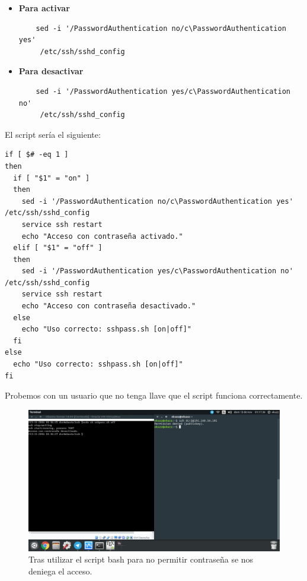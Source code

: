 \begin{flushleft}
\begin{itemize}
	\item \textbf{Para activar} \begin{verbatim}
	sed -i '/PasswordAuthentication no/c\PasswordAuthentication yes'
	 /etc/ssh/sshd_config
	\end{verbatim}
	\item \textbf{Para desactivar} \begin{verbatim}
	sed -i '/PasswordAuthentication yes/c\PasswordAuthentication no'
	 /etc/ssh/sshd_config
	 \end{verbatim}
\end{itemize}
El script sería el siguiente:

\begin{verbatim}
if [ $# -eq 1 ] 
then
  if [ "$1" = "on" ]
  then
    sed -i '/PasswordAuthentication no/c\PasswordAuthentication yes' /etc/ssh/sshd_config
    service ssh restart
    echo "Acceso con contraseña activado."
  elif [ "$1" = "off" ]
  then   
    sed -i '/PasswordAuthentication yes/c\PasswordAuthentication no' /etc/ssh/sshd_config
    service ssh restart
    echo "Acceso con contraseña desactivado."
  else
    echo "Uso correcto: sshpass.sh [on|off]"
  fi
else
  echo "Uso correcto: sshpass.sh [on|off]"
fi
\end{verbatim}


Probemos con un usuario que no tenga llave que el script funciona correctamente.

\begin{figure}[H]
	\centering
	\includegraphics[scale=0.3]{shoff.png}
	\caption{Tras utilizar el script bash para no permitir contraseña se nos deniega el acceso.}
\end{figure}


\end{flushleft}
